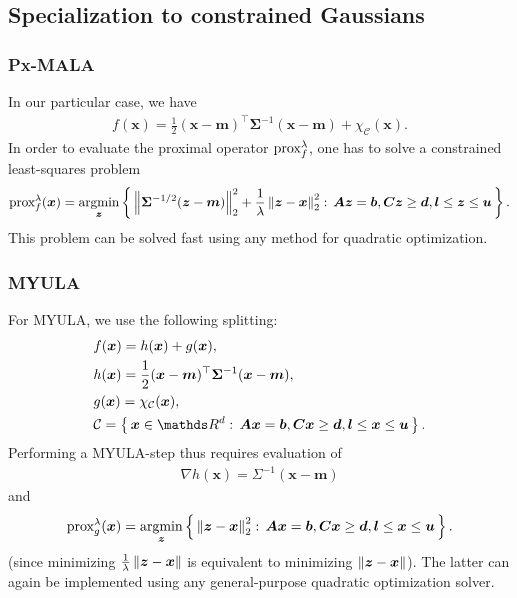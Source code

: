\documentclass[10pt]{article}
\numberwithin{equation}{section}
\begin{document}
\subsection{Specialization to constrained Gaussians}

\subsubsection{Px-MALA}

In our particular case, we have
\begin{align*}
f(\bm x) = \frac{1}{2}(\bm x - \bm m)^\top \bm \Sigma^{-1} (\bm x - \bm m) + \chi_{\mathcal C}(\bm x).
\end{align*}
In order to evaluate the proximal operator $\text{prox}_{f}^{\lambda}$, one has to solve a constrained least-squares problem
\begin{align*}
\text{prox}_{f}^{\lambda}(\bm x) = \operatorname*{argmin}_{\bm z} \left\{\,\left\|\bm \Sigma^{-1/2}(\bm z - \bm m)\right\|_2^2 + \frac{1}{\lambda} \left\|\bm z - \bm x\right\|_2^2:\, \bm A \bm z = \bm b, \bm C \bm z \geq \bm d, \bm l \leq \bm z \leq \bm u\,\right\}.
\end{align*}
This problem can be solved fast using any method for quadratic optimization.

\subsubsection{MYULA}

For MYULA, we use the following splitting:
\begin{align*}
& f(\bm x) = h(\bm x) + g(\bm x), \\
& h(\bm x) = \frac{1}{2} (\bm x - \bm m)^\top \bm \Sigma^{-1} (\bm x - \bm m), \\
& g(\bm x) = \chi_{\mathcal C}(\bm x), \\
& \mathcal C = \Set{\bm x \in \R^d}{\bm A \bm x = \bm b, \bm C \bm x \geq \bm d, \bm l \leq \bm x \leq \bm u}.
\end{align*}
Performing a MYULA-step thus requires evaluation of
\begin{align*}
\nabla h(\bm x) = \Sigma^{-1}(\bm x - \bm m)
\end{align*}
and
\begin{align*}
\text{prox}_{g}^{\lambda}(\bm x) = \operatorname*{argmin}_{\bm z} \left\{\,\left\|\bm z - \bm x\right\|_2^2:\, \bm A \bm x = \bm b, \bm C \bm x \geq \bm d, \bm l \leq \bm x \leq \bm u\,\right\}.
\end{align*}
(since minimizing $\frac{1}{\lambda} \left\|\bm z - \bm x\right\|$ is equivalent to minimizing $\left\|\bm z - \bm x\right\|$). The latter can again be implemented using any general-purpose quadratic optimization solver.
\end{document}
